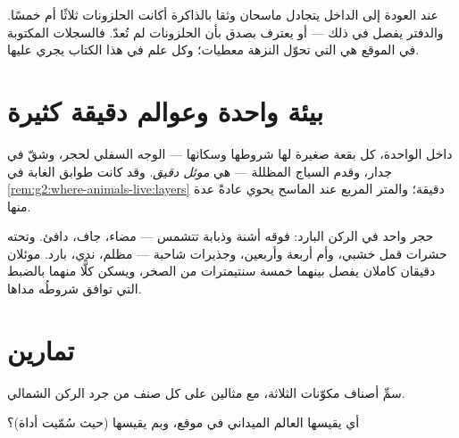 \begin{remark}\label{rem:g6:exploring-our-environment:records}
عند العودة إلى الداخل يتجادل ماسحان وثقا بالذاكرة أكانت الحلزونات
ثلاثًا أم خمسًا. والدفتر يفصل في ذلك --- أو يعترف بصدق بأن
الحلزونات لم تُعدّ. فالسجلات المكتوبة في الموقع هي التي تحوّل
النزهة معطيات؛ وكل علم في هذا الكتاب يجري عليها.
\end{remark}

\section{بيئة واحدة وعوالم دقيقة كثيرة}

\begin{definition}\label{def:g6:exploring-our-environment:microhabitat}
داخل  الواحدة، كل بقعة صغيرة لها شروطها وسكانها --- الوجه
السفلي لحجر، وشقّ في جدار، وقدم السياج المظللة --- هي
\emph{موئل دقيق}. وقد كانت طوابق الغابة في
\cref{rem:g2:where-animals-live:layers}  دقيقة؛ والمتر المربع
عند الماسح يحوي عادةً عدة منها.
\end{definition}

\begin{example}\label{ex:g6:exploring-our-environment:stone}
حجر واحد في الركن البارد: فوقه أشنة وذبابة تتشمس --- مضاء، جاف،
دافئ. وتحته حشرات قمل خشبي، وأم أربعة وأربعين، وجذيرات شاحبة ---
مظلم، ندي، بارد. موئلان دقيقان كاملان يفصل بينهما خمسة سنتيمترات
من الصخر، ويسكن كلًّا منهما بالضبط  التي توافق شروطُه
مداها.
\end{example}

\section{تمارين}

\begin{exercise}[$\star$]\label{exo:g6:exploring-our-environment:1}
سمِّ أصناف مكوّنات  الثلاثة، مع مثالين على كل صنف من جرد
الركن الشمالي.
\end{exercise}

\begin{exercise}[$\star$]\label{exo:g6:exploring-our-environment:2}
أي  يقيسها العالم الميداني في موقع، وبم يقيسها (حيث سُمّيت
أداة)؟
\end{exercise}

